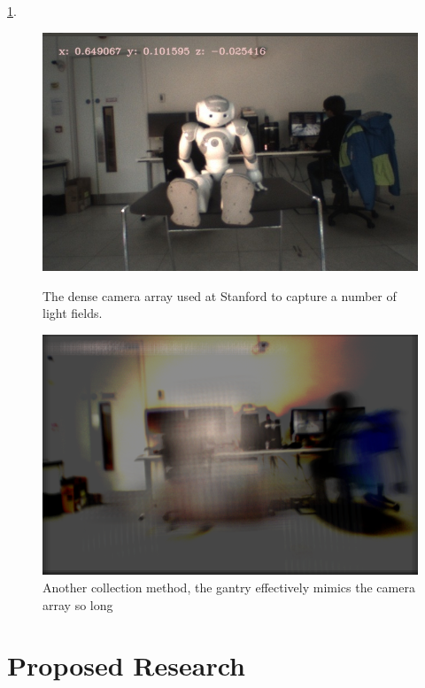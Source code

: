 \documentclass[12pt]{report}
\begin{document}
\ref{fig:seethrough_nau}. 
\begin{figure}[!ht]
	\centering
	\begin{minipage}{0.45\textwidth}
		\centering
		\includegraphics[scale=0.35]{nau_occluding.png}
		\caption{The dense camera array used at Stanford to capture a number of light fields.}
		\label{fig:nau_occluding}
	\end{minipage}\hfill
	\begin{minipage}{0.45\textwidth}
		\centering
		\includegraphics[scale=0.35]{seethrough_nau.png}
		\caption{Another collection method, the gantry effectively mimics the camera array so long}
		\label{fig:seethrough_nau}
	\end{minipage}
\end{figure}

\chapter*{Proposed Research}
\end{document}
